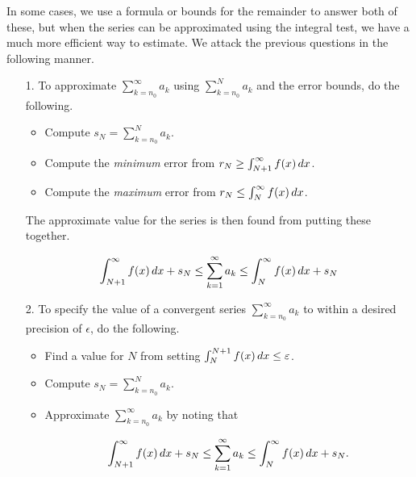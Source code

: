 \documentclass{ximera}
\begin{document}
In some cases, we use a formula or bounds for the remainder to answer both of these, but when the series can be approximated using the integral test, we have a much more efficient way to estimate.  We attack the previous questions in the following manner.

\begin{itemize}
\item[1.] To approximate $\sum_{k=n_0}^{\infty} a_k$ using $\sum_{k=n_0}^{N} a_k$ and the error bounds, do the following.

\begin{itemize}
\item Compute $s_N=\sum_{k=n_0}^{N} a_k$.
\item Compute the \emph{minimum} error from $r_N \geq \int_{N+1}^\infty f(x) \mathop{}\!d x $.
\item Compute the \emph{maximum} error from $r_N \leq \int_{N}^\infty f(x) \mathop{}\!d x $.
\end{itemize}

The approximate value for the series is then found from putting these together.

\[
\int_{N+1}^\infty f(x) \mathop{}\!d x  +s_N \leq \sum_{k=1}^{\infty} a_k \leq \int_{N}^\infty f(x) \mathop{}\!d x  +s_N
\]

\item[2.] To specify the value of a convergent series $\sum_{k=n_0}^{\infty} a_k$ to within a desired precision of $\epsilon$, do the following.

\begin{itemize}
\item Find a value for $N$ from setting $\int_N^{N+1} f(x) \mathop{}\!d x \leq \varepsilon$.  
\item Compute $s_N=\sum_{k=n_0}^{N} a_k$.
\item Approximate $\sum_{k=n_0}^{\infty} a_k$ by noting that 

\[
\int_{N+1}^\infty f(x) \mathop{}\!d x  +s_N \leq \sum_{k=1}^{\infty} a_k \leq \int_{N}^\infty f(x) \mathop{}\!d x  +s_N.
\]
\end{itemize}


\end{itemize}
\end{document}
